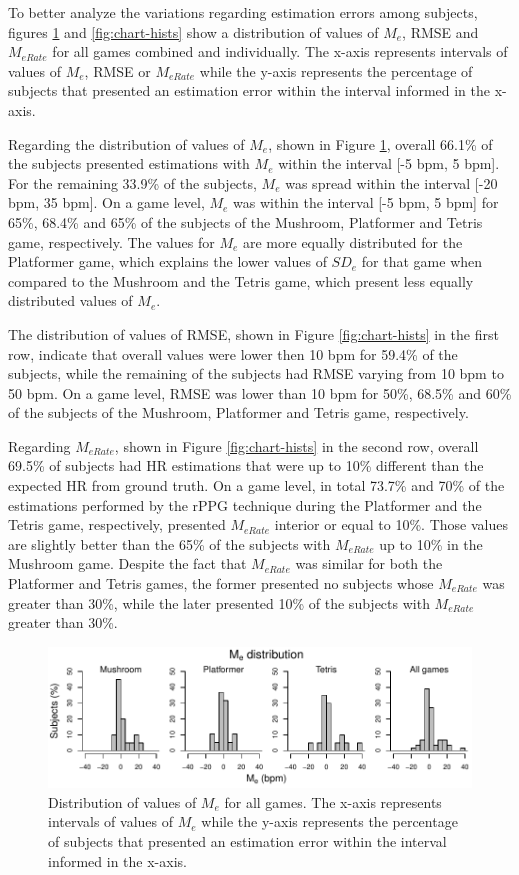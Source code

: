 To better analyze the variations regarding estimation errors among subjects, figures \ref{fig:chart-hists-me} and \ref{fig:chart-hists} show a distribution of values of $M_e$, RMSE and $M_{eRate}$ for all games combined and individually. The x-axis represents intervals of values of $M_e$, RMSE or $M_{eRate}$ while the y-axis represents the percentage of subjects that presented an estimation error within the interval informed in the x-axis.

Regarding the distribution of values of $M_e$, shown in Figure \ref{fig:chart-hists-me}, overall 66.1\% of the subjects presented estimations with $M_e$ within the interval [-5 bpm, 5 bpm]. For the remaining 33.9\% of the subjects, $M_e$ was spread within the interval [-20 bpm, 35 bpm]. On a game level, $M_e$ was within the interval [-5 bpm, 5 bpm] for 65\%, 68.4\% and 65\% of the subjects of the Mushroom, Platformer and Tetris game, respectively. The values for $M_e$ are more equally distributed for the Platformer game, which explains the lower values of $SD_e$ for that game when compared to the Mushroom and the Tetris game, which present less equally distributed values of $M_e$.

The distribution of values of RMSE, shown in Figure \ref{fig:chart-hists} in the first row, indicate that overall values were lower then 10 bpm for 59.4\% of the subjects, while the remaining of the subjects had RMSE varying from 10 bpm to 50 bpm. On a game level, RMSE was lower than 10 bpm for 50\%, 68.5\% and 60\% of the subjects of the Mushroom, Platformer and Tetris game, respectively.

Regarding $M_{eRate}$, shown in Figure \ref{fig:chart-hists} in the second row, overall 69.5\% of subjects had HR estimations that were up to 10\% different than the expected HR from ground truth. On a game level, in total 73.7\% and 70\% of the estimations performed by the rPPG technique during the Platformer and the Tetris game, respectively, presented $M_{eRate}$ interior or equal to 10\%. Those values are slightly better than the 65\% of the subjects with $M_{eRate}$ up to 10\% in the Mushroom game. Despite the fact that $M_{eRate}$ was similar for both the Platformer and Tetris games, the former presented no subjects whose $M_{eRate}$ was greater than 30\%, while the later presented 10\% of the subjects with $M_{eRate}$ greater than 30\%.

\begin{figure}[!h]
\centering
\includegraphics[width=1.0\textwidth]{figures/hist-me.pdf}
\caption{Distribution of values of $M_e$ for all games. The x-axis represents intervals of values of $M_e$ while the y-axis represents the percentage of subjects that presented an estimation error within the interval informed in the x-axis.}
\label{fig:chart-hists-me}
\end{figure}

